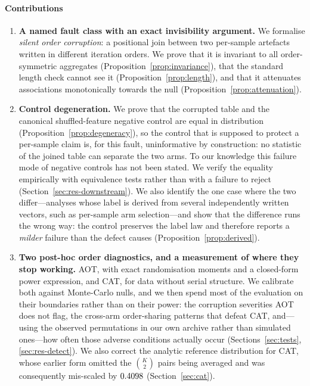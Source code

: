 \documentclass[a4paper,fleqn]{cas-sc}
\begin{document}
\paragraph{Contributions}
\begin{enumerate}
\item \textbf{A named fault class with an exact invisibility argument.} We
formalise \emph{silent order corruption}: a positional join between two
per-sample artefacts written in different iteration orders. We prove that it is
invariant to all order-symmetric aggregates (Proposition~\ref{prop:invariance}),
that the standard length check cannot see it (Proposition~\ref{prop:length}), and
that it attenuates associations monotonically towards the null
(Proposition~\ref{prop:attenuation}).
\item \textbf{Control degeneration.} We prove that the corrupted table and the
canonical shuffled-feature negative control are equal in distribution
(Proposition~\ref{prop:degeneracy}), so the control that is supposed to protect a
per-sample claim is, for this fault, uninformative by construction: no statistic of
the joined table can separate the two arms. To our knowledge this failure
mode of negative controls has not been stated. We verify the equality empirically
with equivalence tests rather than with a failure to reject
(Section~\ref{sec:res-downstream}). We also identify the one case where the two
differ---analyses whose label is derived from several independently written
vectors, such as per-sample arm selection---and show that the difference runs the
wrong way: the control preserves the label law and therefore reports a
\emph{milder} failure than the defect causes (Proposition~\ref{prop:derived}).
\item \textbf{Two post-hoc order diagnostics, and a measurement of where they
stop working.} AOT, with exact randomisation moments and a closed-form power
expression, and CAT, for data without serial structure. We calibrate both against
Monte-Carlo nulls, and we then spend most of the evaluation on their boundaries
rather than on their power: the corruption severities AOT does not flag, the
cross-arm order-sharing patterns that defeat CAT, and---using the observed
permutations in our own archive rather than simulated ones---how often those
adverse conditions actually occur (Sections~\ref{sec:tests},
\ref{sec:res-detect}). We also correct the analytic reference distribution for
CAT, whose earlier form omitted the $\binom{K}{2}$ pairs being averaged and was
consequently mis-scaled by $0.4098{}$
(Section~\ref{sec:cat}).

\end{enumerate}
\end{document}
